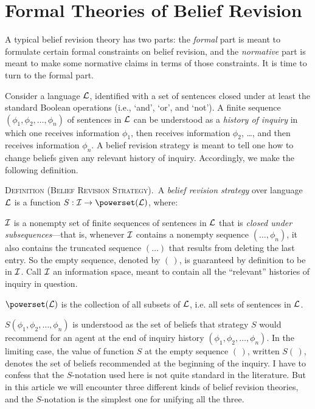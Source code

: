 \section{Formal Theories of Belief Revision}\label{sec-setting}

A typical belief revision theory has two parts: the {\em formal} part is meant to formulate certain formal constraints on belief revision, and the {\em normative} part is meant to make some normative claims in terms of those constraints. It is time to turn to the formal part. 

Consider a language ${\cal L}$, identified with a set of sentences closed under at least the standard Boolean operations (i.e., `and', `or', and `not'). A finite sequence $(\phi_1, \phi_2, \ldots, \phi_n)$ of sentences in ${\cal L}$ can be understood as a {\em history of inquiry} in which one receives information $\phi_1$, then receives information $\phi_2$, \ldots, and then receives information $\phi_n$. A belief revision strategy is meant to tell one how to change beliefs given any relevant history of inquiry. Accordingly, we make the following definition. \op

	\xm \textsc{Definition (Belief Revision Strategy).}\, A {\em belief revision strategy} over language ${\cal L}$ is a function $S: {\cal I} \to \powerset({\cal L)}$, where: \op

	\im ${\cal I}$ is a nonempty set of finite sequences of sentences in ${\cal L}$ that is {\em closed under subsequences}---that is, whenever ${\cal I}$ contains a nonempty sequence $(\ldots, \phi_n)$, it also contains the truncated sequence $(\ldots)$ that results from deleting the last entry. So the empty sequence, denoted by $(\,)$, is guaranteed by definition to be in ${\cal I}$. Call ${\cal I}$ an information space, meant to contain all the ``relevant'' histories of inquiry in question.

	\im $\powerset({\cal L)}$ is the collection of all subsets of ${\cal L}$, i.e. all sets of sentences in ${\cal L}$.

	\im $S(\phi_1, \phi_2, \ldots, \phi_n)$ is understood as the set of beliefs that strategy $S$ would recommend for an agent at the end of inquiry history $(\phi_1, \phi_2, \ldots, \phi_n)$. In the limiting case, the value of function $S$ at the empty sequence $(\,)$, written $S(\,)$, denotes the set of beliefs recommended at the beginning of the inquiry.
	\ed
\ed
I have to confess that the $S$-notation used here is not quite standard in the literature. But in this article we will encounter three different kinds of belief revision theories, and the $S$-notation is the simplest one for unifying all the three.

